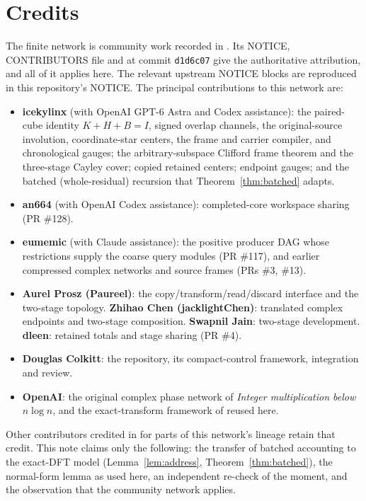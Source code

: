 \documentclass[11pt]{article}
\theoremstyle{definition}
\begin{document}
\section{Credits}\label{sec:credits}
The finite network is community work recorded in \cite{cms}. Its NOTICE,
CONTRIBUTORS file and  at commit
\texttt{d1d6c07} give the authoritative attribution, and all of it applies
here. The relevant upstream NOTICE blocks are reproduced in this repository's
NOTICE. The principal contributions to this network are:
\begin{itemize}
\item \textbf{icekylinx} (with OpenAI GPT-6 Astra and Codex assistance):
  the paired-cube identity $K+H+B=I$, signed overlap channels, the
  original-source involution, coordinate-star centers, the frame and carrier
  compiler, and chronological gauges; the arbitrary-subspace Clifford frame
  theorem and the three-stage Cayley cover; copied retained centers; endpoint
  gauges; and the batched (whole-residual) recursion that
  Theorem~\ref{thm:batched} adapts.
\item \textbf{an664} (with OpenAI Codex assistance): completed-core
  workspace sharing (PR \#128).
\item \textbf{eumemic} (with Claude assistance): the positive producer DAG
  whose restrictions supply the coarse query modules (PR \#117), and earlier
  compressed complex networks and source frames (PRs \#3, \#13).
\item \textbf{Aurel Prosz (Paureel)}: the copy/transform/read/discard interface
  and the two-stage topology. \textbf{Zhihao Chen (jacklightChen)}: translated
  complex endpoints and two-stage composition. \textbf{Swapnil Jain}:
  two-stage development. \textbf{dleen}: retained totals and stage sharing
  (PR \#4).
\item \textbf{Douglas Colkitt}: the repository, its compact-control framework,
  integration and review.
\item \textbf{OpenAI}: the original complex phase network of
  \emph{Integer multiplication below $n\log n$}, and the exact-transform
  framework of \cite{oai-dft} reused here.
\end{itemize}
Other contributors credited in \cite{cms} for parts of this network's lineage
retain that credit. This note claims only the following: the transfer of
batched accounting to the exact-DFT model (Lemma~\ref{lem:address},
Theorem~\ref{thm:batched}), the normal-form lemma as used here, an independent
re-check of the moment, and the observation that the community network applies.
\end{document}

